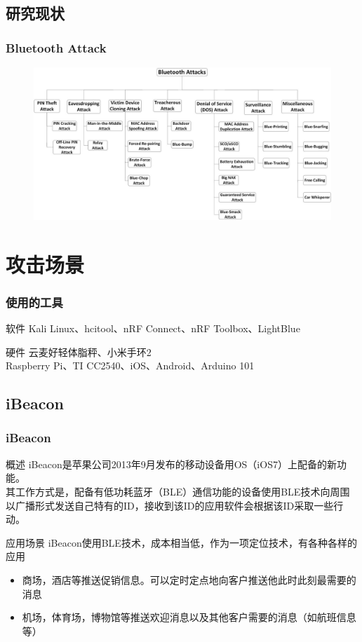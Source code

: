 \documentclass[UTF8]{ctexbeamer}
\begin{document}
\subsection{研究现状}
\begin{frame}
	\frametitle{Bluetooth Attack}
	\begin{figure}
		\includegraphics[width=1\linewidth]{bt_attack.jpg}
	\end{figure}
\end{frame}

\section{攻击场景}
\begin{frame}
  \frametitle{使用的工具}
  \begin{alertblock}{软件}
    Kali Linux、hcitool、nRF Connect、nRF Toolbox、LightBlue
  \end{alertblock}
  \begin{alertblock}{硬件}
    云麦好轻体脂秤、小米手环2\\
    Raspberry Pi、TI CC2540、iOS、Android、Arduino 101
  \end{alertblock}
\end{frame}

\subsection{iBeacon}

\begin{frame}
  \frametitle{iBeacon}
  \begin{block}{概述}
    iBeacon是苹果公司2013年9月发布的移动设备用OS（iOS7）上配备的新功能。 \\
    其工作方式是，配备有低功耗蓝牙（BLE）通信功能的设备使用BLE技术向周围以广播形式发送自己特有的ID，接收到该ID的应用软件会根据该ID采取一些行动。
  \end{block}
  \begin{block}{应用场景}
    iBeacon使用BLE技术，成本相当低，作为一项定位技术，有各种各样的应用
    \begin{itemize}
    \item 商场，酒店等推送促销信息。可以定时定点地向客户推送他此时此刻最需要的消息
    \item 机场，体育场，博物馆等推送欢迎消息以及其他客户需要的消息（如航班信息等）
    \end{itemize}
  \end{block}
\end{frame}
\end{document}
